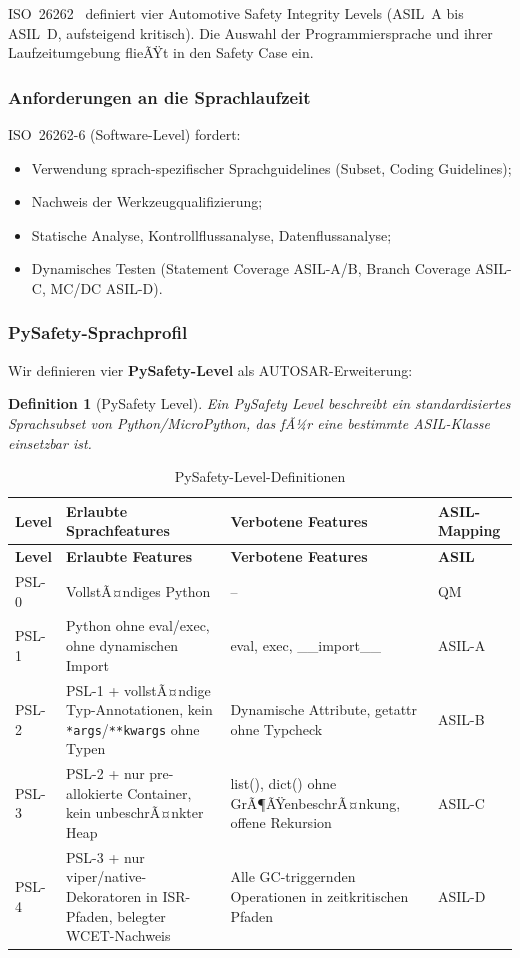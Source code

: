 ﻿\documentclass[12pt,a4paper,twoside]{article}
\newtheorem{definition}{Definition}[section]
\begin{document}
ISO~26262~\cite{iso26262_2018} definiert vier Automotive Safety Integrity Levels
(ASIL~A bis ASIL~D, aufsteigend kritisch). Die Auswahl der Programmiersprache
und ihrer Laufzeitumgebung flieÃŸt in den Safety Case ein.

\subsubsection{Anforderungen an die Sprachlaufzeit}
ISO~26262-6 (Software-Level) fordert:
\begin{itemize}
  \item Verwendung sprach-spezifischer Sprachguidelines
        (Subset, Coding Guidelines);
  \item Nachweis der Werkzeugqualifizierung;
  \item Statische Analyse, Kontrollflussanalyse, Datenflussanalyse;
  \item Dynamisches Testen (Statement Coverage ASIL-A/B,
        Branch Coverage ASIL-C, MC/DC ASIL-D).
\end{itemize}

\subsubsection{PySafety-Sprachprofil}
\label{sec:sprachprofil}

Wir definieren vier \textbf{PySafety-Level} als AUTOSAR-Erweiterung:

\begin{definition}[PySafety Level]
  Ein PySafety Level beschreibt ein standardisiertes Sprachsubset
  von Python/MicroPython, das fÃ¼r eine bestimmte ASIL-Klasse einsetzbar ist.
\end{definition}

\begin{longtable}{lp{5cm}p{5cm}l}
\caption{PySafety-Level-Definitionen}
\label{tab:pysafety}\\
\toprule
\textbf{Level} & \textbf{Erlaubte Sprachfeatures} & \textbf{Verbotene Features} & \textbf{ASIL-Mapping} \\
\midrule
\endfirsthead
\toprule
\textbf{Level} & \textbf{Erlaubte Features} & \textbf{Verbotene Features} & \textbf{ASIL} \\
\midrule
\endhead
\bottomrule
\endfoot
PSL-0 & VollstÃ¤ndiges Python & -- & QM \\
PSL-1 & Python ohne eval/exec, ohne dynamischen Import & eval, exec, \_\_import\_\_ & ASIL-A \\
PSL-2 & PSL-1 + vollstÃ¤ndige Typ-Annotationen, kein \texttt{*args}/\texttt{**kwargs} ohne Typen & Dynamische Attribute, getattr ohne Typcheck & ASIL-B \\
PSL-3 & PSL-2 + nur pre-allokierte Container, kein unbeschrÃ¤nkter Heap & list(), dict() ohne GrÃ¶ÃŸenbeschrÃ¤nkung, offene Rekursion & ASIL-C \\
PSL-4 & PSL-3 + nur viper/native-Dekoratoren in ISR-Pfaden, belegter WCET-Nachweis & Alle GC-triggernden Operationen in zeitkritischen Pfaden & ASIL-D \\
\end{longtable}
\end{document}
